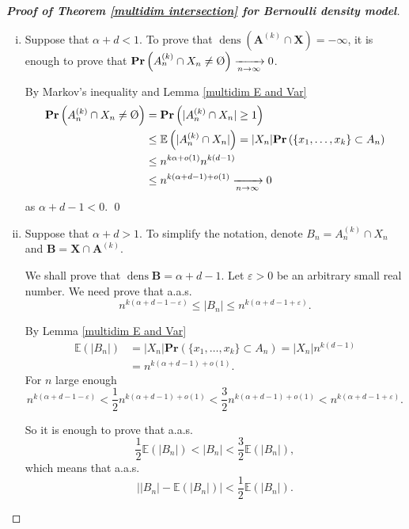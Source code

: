 \documentclass{article}
\DeclareMathOperator{\dens}{dens}
\newcommand{\vide}{\textup{\O}}
\newcommand{\bs}{\boldsymbol}
\newcommand{\tendvers}{\xrightarrow[n\to\infty]{}}
\def\Pr{\mathbf{Pr}}
\newcommand\esp[1]{\mathbb{E}\left( #1 \right)}
\theoremstyle{remark}
\begin{document}
\begin{proof}[\textbf{Proof of Theorem \ref{multidim intersection} for Bernoulli density model}] \quad
\begin{enumerate}[(i)]
    \item Suppose that $\alpha+d<1$. To prove that $\dens(\bs A^{(k)}\cap \bs X) = -\infty$, it is enough to prove that $\Pr\left(A_n^{(k)}\cap X_n \neq \vide\right)\tendvers 0$.
    
    By Markov's inequality and Lemma \ref{multidim E and Var}
    \[\begin{split}\Pr\left(A_n^{(k)}\cap X_n \neq \vide\right) & = \Pr\left(|A_n^{(k)}\cap X_n| \geq 1\right)\\
    & \leq \esp{|A_n^{(k)}\cap X_n|} = |X_n|\Pr\left(\{x_1,\dots,x_k\}\subset A_n\right)\\
    & \leq n^{k\alpha+o(1)}n^{k(d-1)}\\
    & \leq n^{k(\alpha + d -1 )+o(1)} \tendvers 0
    \end{split}\]
    as $\alpha+d-1<0$. \qed
    
    \item Suppose that $\alpha+d>1$. To simplify the notation, denote $B_n =  A_n^{(k)}\cap X_n$ and $\bs B = \bs X\cap \bs A^{(k)}$. 
    
    We shall prove that $\dens \bs B = \alpha+d-1$. Let $\varepsilon>0$ be an arbitrary small real number. We need prove that a.a.s.
    \[n^{k(\alpha+d-1-\varepsilon)} \leq |B_n| \leq n^{k(\alpha+d-1+\varepsilon)}.\]
    
    By Lemma \ref{multidim E and Var} 
    \begin{align*} \esp{|B_n|} & = |X_n|\Pr\left(\{x_1,\dots,x_k\}\subset A_n\right) = |X_n|n^{k(d-1)} \\ 
     &= n^{k(\alpha + d -1)+o(1)}.
    \end{align*}
    For $n$ large enough
    \[n^{k(\alpha+d-1-\varepsilon)} < \frac{1}{2}n^{k(\alpha+d-1)+o(1)} < \frac{3}{2}n^{k(\alpha+d-1)+o(1)} < n^{k(\alpha+d-1+\varepsilon)}.\]

    So it is enough to prove that a.a.s.
    \[\frac{1}{2}\esp{|B_n|} < |B_n| < \frac{3}{2}\esp{|B_n|},\]
    which means that a.a.s.
    \[\left||B_n|-\esp{|B_n|}\right| < \frac{1}{2}\esp{|B_n|}.\]
   

\end{enumerate}
\end{proof}
\end{document}
